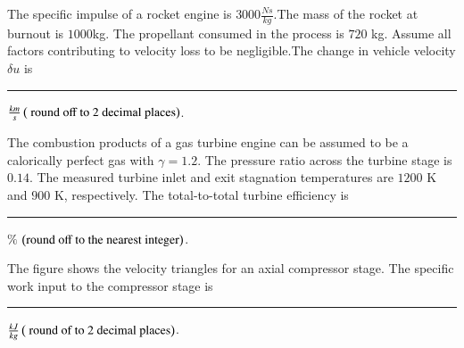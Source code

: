 \documentclass[journal]{IEEEtran}
\begin{document}
\begin{enumerate}
{{}
\item{
The specific impulse of a rocket engine is $3000\frac{Ns}{kg}$.The mass of the rocket at burnout is $1000$kg. The propellant consumed in the process is $720$ kg. Assume all factors contributing to velocity loss to be negligible.The change in vehicle velocity $\delta u$ is \rule{2cm}{0.15mm} $\frac{km}{s}\left(\text{ round off to $2$ decimal places}\right)$.\\
}
\item{
The combustion products of a gas turbine engine can be assumed to be a calorically perfect gas with $\gamma= 1.2$. The pressure ratio across the turbine stage is $0.14$. The measured turbine inlet and exit stagnation temperatures are $1200$ K and $900$ K, respectively. The total-to-total turbine efficiency is \rule{2cm}{0.15mm}$\%$ $\left(\text{round off to the nearest integer}\right)$.
}
\item{
The figure shows the velocity triangles for an axial compressor stage. The specific work input to the compressor stage is \rule{2cm}{0.15mm}$\frac{kJ}{kg}\left(\text{ round of to $2$ decimal places}\right)$.
\begin{figure}[H]
\centering
{}%
\label{fig:my_label}

\end{figure}}}
\end{enumerate}
\end{document}
